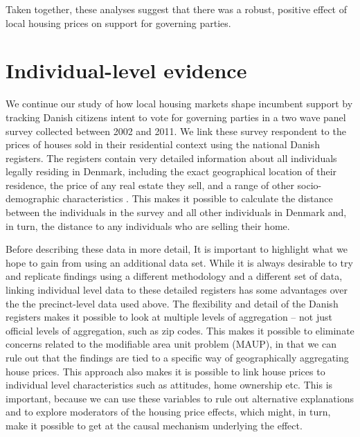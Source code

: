 \documentclass[12pt,a4paper]{article}
\begin{document}
Taken together, these analyses suggest that there was a robust, positive effect of local housing prices on support for governing parties.

\section{Individual-level evidence}
We continue our study of how local housing markets shape incumbent support by tracking Danish citizens intent to vote for governing parties in a two wave panel survey collected between 2002 and 2011. We link these survey respondent to the prices of houses sold in their residential context using the national Danish registers. The registers contain very detailed information about all individuals legally residing in Denmark, including the exact geographical location of their residence, the price of any real estate they sell, and a range of other socio-demographic characteristics \citep{thygesen2011introduction}. This makes it possible to calculate the distance between the individuals in the survey and all other individuals in Denmark and, in turn, the distance to any individuals who are selling their home. 
 
Before describing these data in more detail, It is important to highlight what we hope to gain from using an additional data set. While it is always desirable to try and replicate findings using a different methodology and a different set of data, linking individual level data to these detailed registers has some advantages over the the precinct-level data used above. The flexibility and detail of the Danish registers makes it possible to look at multiple levels of aggregation -- not just official levels of aggregation, such as zip codes. This makes it possible to eliminate concerns related to the modifiable area unit problem (MAUP), in that we can rule out that the findings are tied to a specific way of geographically aggregating house prices.  This approach also makes  it is possible to link house prices to individual level characteristics such as attitudes, home ownership etc. This is important, because we can use these variables to rule out alternative explanations and to explore moderators of the housing price effects, which might, in turn, make it possible to get at the causal mechanism underlying the effect.
\end{document}
